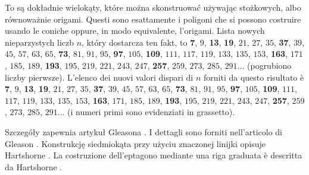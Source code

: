 To są dokładnie wielokąty, które można skonstruować używając stożkowych, albo równoważnie origami. %
Questi sono esattamente i poligoni che si possono costruire usando le coniche oppure, in modo equivalente, l'origami. %
Lista nowych nieparzystych liczb $n$, który dostarcza ten fakt, to \textbf{7}, $9$, \textbf{13}, \textbf{19}, $21$, $27$, $35$, \textbf{37}, $39$, $45$, $57$, $63$, $65$, \textbf{73}, $81$, $91$, $95$, \textbf{97}, $105$, \textbf{109}, $111$, $117$, $119$, $133$, $135$, $153$, \textbf{163}, $171$, $185$, $189$, \textbf{193}, $195$, $219$, $221$, $243$, $247$, \textbf{257}, $259$, $273$, $285$, $291\ldots$ (pogrubiono liczby pierwsze). %
L'elenco dei nuovi valori dispari di $n$ forniti da questo risultato è \textbf{7}, $9$, \textbf{13}, \textbf{19}, $21$, $27$, $35$, \textbf{37}, $39$, $45$, $57$, $63$, $65$, \textbf{73}, $81$, $91$, $95$, \textbf{97}, $105$, \textbf{109}, $111$, $117$, $119$, $133$, $135$, $153$, \textbf{163}, $171$, $185$, $189$, \textbf{193}, $195$, $219$, $221$, $243$, $247$, \textbf{257}, $259$, $273$, $285$, $291\ldots$ (i numeri primi sono evidenziati in grassetto). %

Szczegóły zapewnia artykuł Gleasona \cite{gleason_1988}. %
I dettagli sono forniti nell'articolo di Gleason \cite{gleason_1988}. %
%
Konstrukcję siedmiokąta przy użyciu znaczonej linijki opisuje Hartshorne \cite[s. 259-270]{hartshorne_2000}. %
La costruzione dell'eptagono mediante una riga graduata è descritta da Hartshorne \cite[p. 259-270]{hartshorne_2000}. %

%